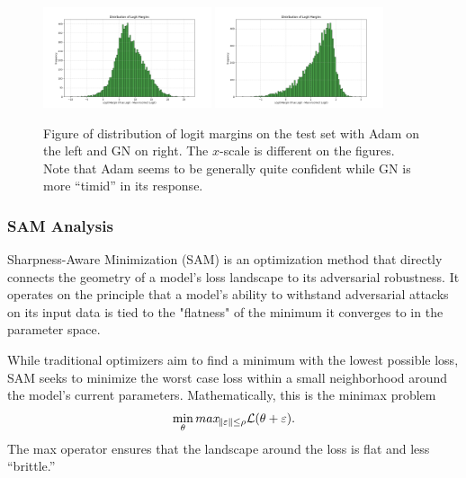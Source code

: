 \documentclass{article}
\begin{document}
    \begin{figure}[ht]
        \centering
        \includegraphics[width=0.44\textwidth]{../src/outputs/2025-09-10/23-05-38/logit_margin_distribution.png}
        \includegraphics[width=0.44\textwidth]{../src/outputs/2025-09-10/23-05-59/logit_margin_distribution.png}
        \caption{Figure of distribution of logit margins on the test set with Adam on the left and GN on right.
        The $x$-scale is different on the figures.
        Note that Adam seems to be generally quite confident while GN is more ``timid'' in its response.}
        \label{fig:logit-margin}
    \end{figure}

    \subsubsection{SAM Analysis}
    Sharpness-Aware Minimization (SAM) is an optimization method that directly connects the geometry of a model's loss landscape to its adversarial robustness.
    It operates on the principle that a model's ability to withstand adversarial attacks on its input data is tied to the "flatness" of the minimum it converges to in the parameter space.

    While traditional optimizers aim to find a minimum with the lowest possible loss, SAM seeks to minimize the worst case loss within a small neighborhood around the model's current parameters.
    Mathematically, this is the minimax problem
    \begin{align*}
        \min_{\theta} max_{\norm{\varepsilon} \le \rho} \mathcal L(\theta + \varepsilon).
    \end{align*}
    The max operator ensures that the landscape around the loss is flat and less ``brittle.''
\end{document}
